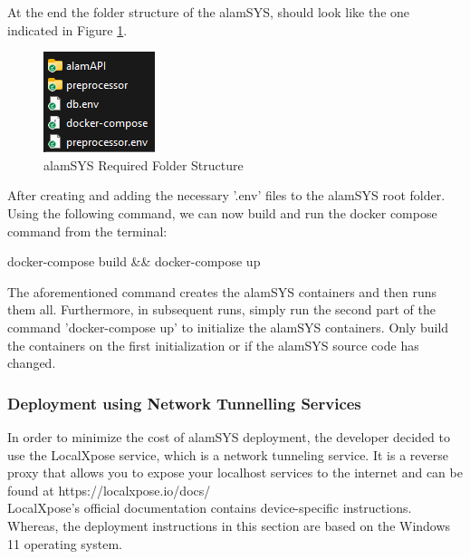 At the end the folder structure of the alamSYS, should look like
the one indicated in Figure \ref{fig:alamSYS_foldStruct}.
\begin{figure}[ht]
    \centering
    \includegraphics[height=0.15\textheight]{./assets/Chapter_4/Documentation/alamSYS_folder.png}
    \caption{alamSYS Required Folder Structure}
    \label{fig:alamSYS_foldStruct}
\end{figure}
\FloatBarrier

After creating and adding the necessary '.env' files to the alamSYS root 
folder. Using the following command, we can now build and run the 
docker compose command from the terminal:
\hfill \\
\begin{python}
    docker-compose build && docker-compose up
\end{python}

The aforementioned command creates the alamSYS containers and then runs them 
all. Furthermore, in subsequent runs, simply run the second part of the 
command 'docker-compose up' to initialize the alamSYS containers. 
Only build the containers on the first initialization or if the alamSYS 
source code has changed.

\subsubsection{Deployment using Network Tunnelling Services}
\label{subsubsec:deploymeny_tunnel}
In order to minimize the cost of alamSYS deployment, the developer 
decided to use the LocalXpose service, which is a network tunneling service. 
It is a reverse proxy that allows you to expose your localhost services 
to the internet and can be found at https://localxpose.io/docs/
\\

LocalXpose's official documentation contains device-specific 
instructions. Whereas, the deployment instructions in this section are based 
on the Windows 11 operating system.
\\

